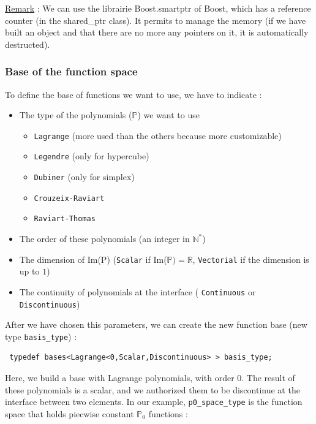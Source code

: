 \underline{Remark} : We can use the librairie Boost.smartptr of Boost, which has a reference counter (in the shared\_ptr class). It permits
to manage the memory (if we have built an object and that there are no more any pointers on it, it is automatically destructed).

\subsubsection{Base of the function space}
\label{sec:base-funct}
To define the base of functions we want to use, we have to indicate :
\begin{itemize}
 \item The type of the polynomials ($\mathbb{P}$) we want to use
 \begin{itemize}
   \item \lstinline!Lagrange! (more used than the others because more customizable)
   \item \lstinline!Legendre! (only for hypercube)
   \item \lstinline!Dubiner! (only for simplex)
   \item \lstinline!Crouzeix-Raviart!
   \item \lstinline!Raviart-Thomas!
 \end{itemize}

 \item The order of these polynomials (an integer in $\mathbb{N}^*$)
 \item The dimension of Im(P) (\lstinline!Scalar! if Im($\mathbb{P})=\mathbb{R}$, \lstinline!Vectorial! if the dimension is up to $1$)
 \item The continuity of polynomials at the interface ( \lstinline!Continuous! or \lstinline!Discontinuous!)
\end{itemize}
After we have chosen this parameters, we can create the new function base (new type \lstinline!basis_type!) :
\begin{lstlisting}
 typedef bases<Lagrange<0,Scalar,Discontinuous> > basis_type;
\end{lstlisting}

Here, we build a base with Lagrange polynomials, with order 0. The result of these polynomials is a scalar, and we authorized them
to be discontinue at the interface between two elements. In our example, \lstinline!p0_space_type! is the function space that holds piecwise constant $\mathbb{P}_0$ functions :  \\


